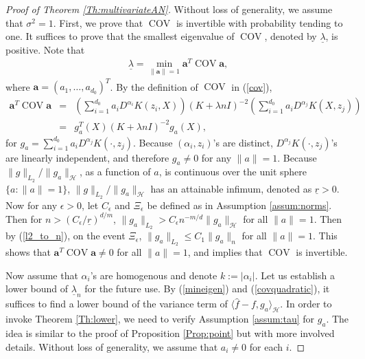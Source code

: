 \documentclass[12pt]{article}
\theoremstyle{plain}
\theoremstyle{remark}
\begin{document}
\begin{proof}[Proof of Theorem \ref{Th:multivariateAN}]
    Without loss of generality, we assume that $\sigma^2=1$. First, we prove that $\operatorname{COV}$ is invertible with probability tending to one. It suffices to prove that the smallest eigenvalue of $\operatorname{COV}$, denoted by $\underline{\lambda}$, is positive. Note that
    \begin{eqnarray}\label{mineigen}
        \underline{\lambda}=\min_{\|\mathbf{a}\|=1}\mathbf{a}^T\operatorname{COV}\mathbf{a},
    \end{eqnarray}
    where $\mathbf{a}=(a_1,\ldots,a_{d_0})^T$. By the definition of $\operatorname{COV}$ in (\ref{cov}),
    \begin{eqnarray}\label{covquadratic}
        \mathbf{a}^T\operatorname{COV}\mathbf{a}&=&\left(\sum_{i=1}^{d_0}a_iD^{\alpha_i} K(z_i,X)\right)(K+\lambda n I)^{-2}\left(\sum_{i=1}^{d_0}a_iD^{\alpha_j}K(X,z_j)\right)\nonumber\\
        &=&g_a^T(X)(K+\lambda n I)^{-2}g_a(X),
    \end{eqnarray}
    for $g_a=\sum_{i=1}^{d_0}a_iD^{\alpha_j}K(\cdot,z_j)$. Because $(\alpha_i,z_i)$'s are distinct, $D^{\alpha_j}K(\cdot,z_j)$'s are linearly independent, and therefore $g_a\neq 0$ for any $\|a\|=1$. Because $\|g\|_{L_2}/\|g_a\|_\mathcal{H}$, as a function of $a$, is continuous over the unit sphere $\{a:\|a\|=1\}$, $\|g\|_{L_2}/\|g_a\|_\mathcal{H}$ has an attainable infimum, denoted as $\underline{r}>0$. Now for any $\epsilon>0$, let $C_\epsilon$ and $\Xi_\epsilon$ be defined as in Assumption \ref{assum:norms}. Then for $n>(C_\epsilon/\underline{r})^{d/m}$, $\|g_a\|_{L_2}>C_\epsilon n^{-m/d}\|g_a\|_\mathcal{H}$ for all $\|a\|=1$. Then by (\ref{l2_to_n}), on the event $\Xi_\epsilon$, $\|g_a\|_{L_2}\leq C_1\|g_a\|_n$ for all $\|a\|=1$. This shows that $\mathbf{a}^T\operatorname{COV}\mathbf{a}\neq 0$ for all $\|a\|=1$, and implies that $\operatorname{COV}$ is invertible.

    Now assume that $\alpha_i$'s are homogenous and denote $k:=|\alpha_i|$.
    Let us establish a lower bound of $\underline{\lambda}_n$ for the future use. By (\ref{mineigen}) and (\ref{covquadratic}), it suffices to find a lower bound of the variance term of $\langle \hat{f}-f,g_a\rangle_\mathcal{H}$. In order to invoke Theorem \ref{Th:lower}, we need to verify Assumption \ref{assum:tau} for $g_a$. The idea is similar to the proof of Proposition \ref{Prop:point} but with more involved details. Without loss of generality, we assume that $a_i\neq 0$ for each $i$.


\end{proof}
\end{document}
